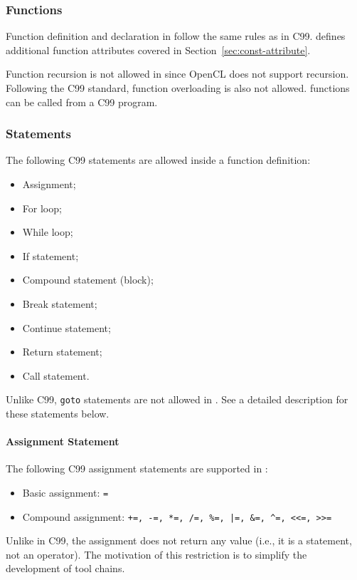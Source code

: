 \subsubsection{Functions}
Function definition and declaration in \pencil follow the same
rules as in C99.
\pencil defines additional function attributes covered
in Section~\ref{sec:const-attribute}.

Function recursion is not allowed in \pencil since OpenCL does
not support recursion.  Following the C99 standard, function overloading
is also not allowed.
\pencil functions can be called from a C99 program.

\subsubsection{Statements}
The following C99 statements are allowed inside a \pencil function definition:
\begin{itemize}
  \item Assignment;
  \item For loop;
  \item While loop;
  \item If statement;
  \item Compound statement (block);
  \item Break statement;
  \item Continue statement;
  \item Return statement;
  \item Call statement.
\end{itemize}
Unlike C99, \lstinline!goto! statements are not allowed in \pencil.
See a detailed description for these statements below.

\paragraph{Assignment Statement}
\label{sec:assignments}
The following C99 assignment statements are supported in \pencil:
\begin{itemize}
  \item Basic assignment: \lstinline!=!
  \item Compound assignment: \lstinline{+=, -=, *=, /=, %=, |=, &=, ^=, <<=, >>=}
\end{itemize}

Unlike in C99, the \pencil assignment does not return any value (i.e.,
it is a statement, not an operator).
The motivation of this restriction is to simplify the development of
\pencil tool chains.

